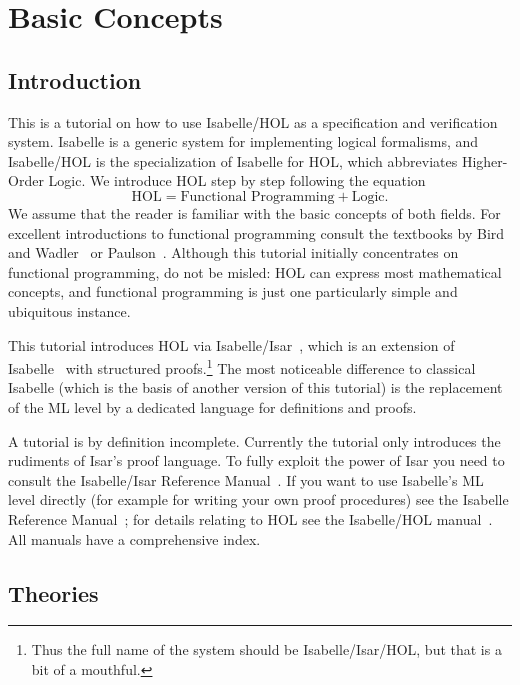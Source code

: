 \chapter{Basic Concepts}

\section{Introduction}

This is a tutorial on how to use Isabelle/HOL as a specification and
verification system. Isabelle is a generic system for implementing logical
formalisms, and Isabelle/HOL is the specialization of Isabelle for
HOL, which abbreviates Higher-Order Logic. We introduce HOL step by step
following the equation
\[ \mbox{HOL} = \mbox{Functional Programming} + \mbox{Logic}. \]
We assume that the reader is familiar with the basic concepts of both fields.
For excellent introductions to functional programming consult the textbooks
by Bird and Wadler~\cite{Bird-Wadler} or Paulson~\cite{paulson-ml2}.  Although
this tutorial initially concentrates on functional programming, do not be
misled: HOL can express most mathematical concepts, and functional
programming is just one particularly simple and ubiquitous instance.

This tutorial introduces HOL via Isabelle/Isar~\cite{isabelle-isar-ref},
which is an extension of Isabelle~\cite{paulson-isa-book} with structured
proofs.\footnote{Thus the full name of the system should be
  Isabelle/Isar/HOL, but that is a bit of a mouthful.} The most noticeable
difference to classical Isabelle (which is the basis of another version of
this tutorial) is the replacement of the ML level by a dedicated language for
definitions and proofs.

A tutorial is by definition incomplete.  Currently the tutorial only
introduces the rudiments of Isar's proof language. To fully exploit the power
of Isar you need to consult the Isabelle/Isar Reference
Manual~\cite{isabelle-isar-ref}. If you want to use Isabelle's ML level
directly (for example for writing your own proof procedures) see the Isabelle
Reference Manual~\cite{isabelle-ref}; for details relating to HOL see the
Isabelle/HOL manual~\cite{isabelle-HOL}. All manuals have a comprehensive
index.

\section{Theories}
\label{sec:Basic:Theories}

